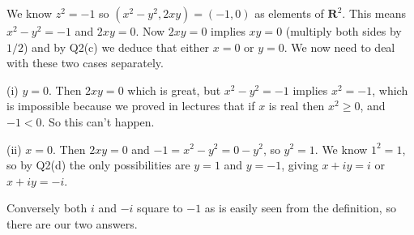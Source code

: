 \documentclass[10pt]{article}
\newcommand{\R}{\mathbf{R}}
\begin{document}
\medskip{} We know $z^2=-1$ so $(x^2-y^2,2xy)=(-1,0)$ as elements of $\R^2$. This means $x^2-y^2=-1$ and $2xy=0$. Now $2xy=0$ implies $xy=0$ (multiply both sides by $1/2$) and by Q2(c) we deduce that either $x=0$ or $y=0$. We now need to deal with these two cases separately.

(i) $y=0$. Then $2xy=0$ which is great, but $x^2-y^2=-1$ implies $x^2=-1$, which is impossible because we proved in lectures that if $x$ is real then $x^2\geq0$, and $-1<0$. So this can't happen.

(ii) $x=0$. Then $2xy=0$ and $-1=x^2-y^2=0-y^2$, so $y^2=1$. We know $1^2=1$, so by Q2(d) the only possibilities are $y=1$ and $y=-1$, giving $x+iy=i$ or $x+iy=-i$. 

Conversely both $i$ and $-i$ square to $-1$ as is easily seen from the definition, so there are our two answers.
\end{document}
